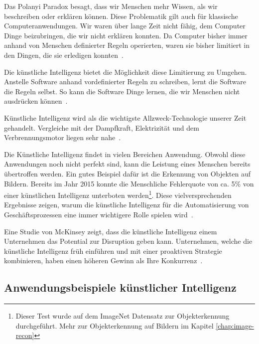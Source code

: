 Das Polanyi Paradox besagt, dass wir Menschen mehr Wissen, als wir beschreiben oder erklären können. Diese Problematik gilt auch für klassische Computeranwendungen. Wir waren über lange Zeit nicht fähig, dem Computer Dinge beizubringen, die wir nicht erklären konnten. Da Computer bisher immer anhand von Menschen definierter Regeln operierten, waren sie bisher limitiert in den Dingen, die sie erledigen konnten~\autocite{McAfee}. 

Die künstliche Intelligenz bietet die Möglichkeit diese Limitierung zu Umgehen. Anstelle Software anhand vordefinierter Regeln zu schreiben, lernt die Software die Regeln selbst. So kann die Software Dinge lernen, die wir Menschen nicht ausdrücken können~\autocite{McAfee}.

Künstliche Intelligenz wird als die wichtigste Allzweck-Technologie unserer Zeit gehandelt. Vergleiche mit der Dampfkraft, Elektrizität und dem Verbrennungsmotor liegen sehr nahe~\autocite{McAfee}.

Die Künstliche Intelligenz findet in vielen Bereichen Anwendung. Obwohl diese Anwendungen noch nicht perfekt sind, kann die Leistung eines Menschen bereits übertroffen werden. Ein gutes Beispiel dafür ist die Erkennung von Objekten auf Bildern. Bereits im Jahr 2015 konnte die Menschliche Fehlerquote von ca. 5\% von einer künstlichen Intelligenz unterboten werden\footnote{Dieser Test wurde auf dem ImageNet Datensatz zur Objekterkennung durchgeführt. Mehr zur Objekterkennung auf Bildern im Kapitel \ref{chap:image-recon}}. Diese vielversprechenden Ergebnisse zeigen, warum die künstliche Intelligenz für die Automatisierung von Geschäftsprozessen eine immer wichtigere Rolle spielen wird~\autocite{McAfee}.

Eine Studie von McKinsey zeigt, dass die künstliche Intelligenz einem Unternehmen das Potential zur Disruption geben kann. Unternehmen, welche die künstliche Intelligenz früh einführen und mit einer proaktiven Strategie kombinieren, haben einen höheren Gewinn als Ihre Konkurrenz~\autocite{Bughin}. 

\subsection{Anwendungsbeispiele künstlicher Intelligenz}


